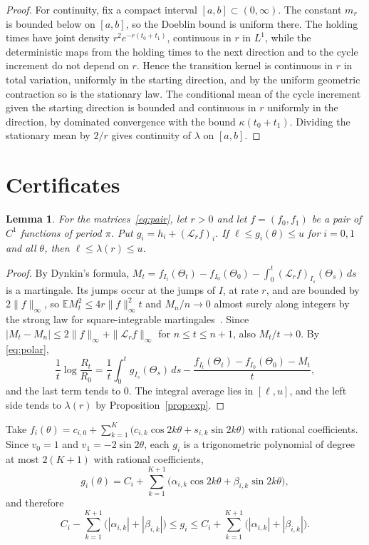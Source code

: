 \documentclass[11pt]{amsart}
\newtheorem{lemma}[theorem]{Lemma}
\newcommand{\E}{\mathbb{E}}
\newcommand{\cL}{\mathcal{L}}
\begin{document}
\begin{proof}
For continuity, fix a compact interval $[a,b]\subset(0,\infty)$. The constant $m_r$ is bounded below on $[a,b]$, so the Doeblin
bound is uniform there. The holding times have joint density $r^2e^{-r(t_0+t_1)}$, continuous in $r$ in $L^1$, while the
deterministic maps from the holding times to the next direction and to the cycle increment do not depend on $r$. Hence
the transition kernel is continuous in $r$ in total variation, uniformly in the starting direction, and by the uniform
geometric contraction so is the stationary law. The conditional mean of the cycle increment given the starting
direction is bounded and continuous in $r$ uniformly in the direction, by dominated convergence with the bound
$\kappa(t_0+t_1)$. Dividing the stationary mean by $2/r$ gives continuity of $\lambda$ on $[a,b]$.
\end{proof}

\section{Certificates}\label{sec:cert}

\begin{lemma}\label{lem:cert}
For the matrices~\eqref{eq:pair}, let $r>0$ and let $f=(f_0,f_1)$ be a pair of $C^1$ functions of period $\pi$. Put $g_i=h_i+(\cL_rf)_i$. If
$\ell\le g_i(\theta)\le u$ for $i=0,1$ and all $\theta$, then $\ell\le\lambda(r)\le u$.
\end{lemma}

\begin{proof}
By Dynkin's formula, $M_t=f_{I_t}(\Theta_t)-f_{I_0}(\Theta_0)-\int_0^t(\cL_rf)_{I_s}(\Theta_s)\,ds$ is a martingale.
Its jumps occur at the jumps of $I$, at rate $r$, and are bounded by $2\|f\|_\infty$, so
$\E M_t^2\le4r\|f\|_\infty^2t$ and $M_n/n\to0$ almost surely along integers by the strong law for square-integrable
martingales~\cite[Theorem~2.18]{HH80}. Since $|M_t-M_n|\le2\|f\|_\infty+\|\cL_rf\|_\infty$ for $n\le t\le n+1$, also
$M_t/t\to0$. By
\eqref{eq:polar},
\[
\frac1t\log\frac{R_t}{R_0}=\frac1t\int_0^tg_{I_s}(\Theta_s)\,ds-\frac{f_{I_t}(\Theta_t)-f_{I_0}(\Theta_0)-M_t}{t},
\]
and the last term tends to $0$. The integral average lies in $[\ell,u]$, and the left side tends to $\lambda(r)$ by
Proposition~\ref{prop:exp}.
\end{proof}

Take $f_i(\theta)=c_{i,0}+\sum_{k=1}^K\bigl(c_{i,k}\cos2k\theta+s_{i,k}\sin2k\theta\bigr)$ with rational coefficients.
Since $v_0=1$ and $v_1=-2\sin2\theta$, each $g_i$ is a trigonometric polynomial of degree at most $2(K+1)$ with rational
coefficients,
\begin{equation}\label{eq:g}
g_i(\theta)=C_i+\sum_{k=1}^{K+1}\bigl(\alpha_{i,k}\cos2k\theta+\beta_{i,k}\sin2k\theta\bigr),
\end{equation}
and therefore
\begin{equation}\label{eq:range}
C_i-\sum_{k=1}^{K+1}\bigl(|\alpha_{i,k}|+|\beta_{i,k}|\bigr)\le g_i\le C_i+\sum_{k=1}^{K+1}\bigl(|\alpha_{i,k}|+|\beta_{i,k}|\bigr).
\end{equation}
\end{document}
